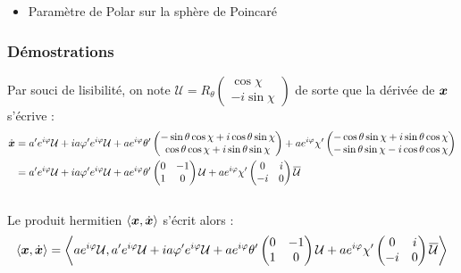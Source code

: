 \begin{annexe}
\begin{itemize}
	\item Paramètre de Polar sur la sphère de Poincaré
	
\end{itemize}


\subsubsection{Démostrations}\label{ann:demo_phases_2var}

\begin{demo}
	Par souci de lisibilité, on note $\mathcal{U} = R_{\theta} \begin{pmatrix} \cos\chi \\ -i\sin\chi \end{pmatrix}$ de sorte que la dérivée de $\bf{x}$ s'écrive :
	\begin{align*}
		\dot{\bf{x}} 
		&= a'e^{i\varphi}\mathcal{U} + ia\varphi'e^{i\varphi} \mathcal{U} + ae^{i\varphi}\theta'\begin{pmatrix} -\sin\theta \cos\chi + i\cos\theta \sin\chi \\ \cos\theta \cos\chi + i\sin\theta \sin\chi \end{pmatrix} + ae^{i\varphi}\chi'\begin{pmatrix} -\cos\theta \sin\chi + i\sin\theta \cos\chi \\ -\sin\theta \sin\chi - i\cos\theta \cos\chi \end{pmatrix} \\
		&= a'e^{i\varphi}\mathcal{U} + ia\varphi'e^{i\varphi} \mathcal{U} + ae^{i\varphi}\theta'\begin{pmatrix} 0 & -1 \\ 1 & 0 \end{pmatrix}\mathcal{U} + ae^{i\varphi}\chi'\begin{pmatrix} 0 & i \\ -i & 0 \end{pmatrix}\congu{\mathcal{U}}
	\end{align*}
	\\
	Le produit hermitien $\langle \bf{x}, \dot{\bf{x}}\rangle$ s'écrit alors :
	\begin{align*}
		\langle \bf{x}, \dot{\bf{x}}\rangle 
		&= \left\langle ae^{i\varphi}\mathcal{U}, a'e^{i\varphi}\mathcal{U} + ia\varphi'e^{i\varphi} \mathcal{U} + ae^{i\varphi}\theta'\begin{pmatrix} 0 & -1 \\ 1 & 0 \end{pmatrix}\mathcal{U} + ae^{i\varphi}\chi'\begin{pmatrix} 0 & i \\ -i & 0 \end{pmatrix}\congu{\mathcal{U}}\right\rangle \\

\end{align*}
\end{demo}
\end{annexe}
